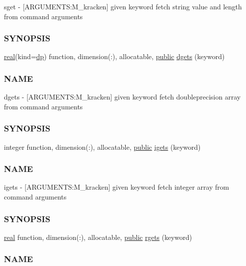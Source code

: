 \begin{DoxyCompactItemize}
\begin{DoxyCompactList}
sget -\/ \mbox{[}A\+R\+G\+U\+M\+E\+N\+TS\+:M\+\_\+kracken\mbox{]} given keyword fetch string value and length from command arguments \subsubsection*{S\+Y\+N\+O\+P\+S\+IS}\end{DoxyCompactList}\item 
\hyperlink{read__watch_83_8txt_abdb62bde002f38ef75f810d3a905a823}{real}(kind=\hyperlink{namespacem__kracken_a1de91e5ca55bf4fab118936bf4fad36a}{dp}) function, dimension(\+:), allocatable, \hyperlink{M__stopwatch_83_8txt_a2f74811300c361e53b430611a7d1769f}{public} \hyperlink{namespacem__kracken_a76e99048e7fb6010dcb7173ef958c932}{dgets} (keyword)
\begin{DoxyCompactList}\small\item\em \subsubsection*{N\+A\+ME}

dgets -\/ \mbox{[}A\+R\+G\+U\+M\+E\+N\+TS\+:M\+\_\+kracken\mbox{]} given keyword fetch doubleprecision array from command arguments \subsubsection*{S\+Y\+N\+O\+P\+S\+IS}\end{DoxyCompactList}\item 
integer function, dimension(\+:), allocatable, \hyperlink{M__stopwatch_83_8txt_a2f74811300c361e53b430611a7d1769f}{public} \hyperlink{namespacem__kracken_ac118bb44d855d68bfce6caa80d60e5e0}{igets} (keyword)
\begin{DoxyCompactList}\small\item\em \subsubsection*{N\+A\+ME}

igets -\/ \mbox{[}A\+R\+G\+U\+M\+E\+N\+TS\+:M\+\_\+kracken\mbox{]} given keyword fetch integer array from command arguments \subsubsection*{S\+Y\+N\+O\+P\+S\+IS}\end{DoxyCompactList}\item 
\hyperlink{read__watch_83_8txt_abdb62bde002f38ef75f810d3a905a823}{real} function, dimension(\+:), allocatable, \hyperlink{M__stopwatch_83_8txt_a2f74811300c361e53b430611a7d1769f}{public} \hyperlink{namespacem__kracken_aa1a29fad1518c15d8710d273755a17cc}{rgets} (keyword)
\begin{DoxyCompactList}\small\item\em \subsubsection*{N\+A\+ME}


\end{DoxyCompactList}
\end{DoxyCompactItemize}
